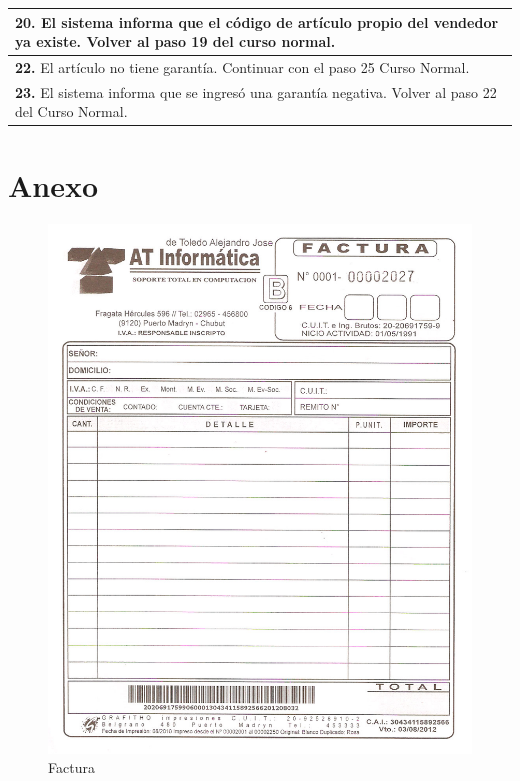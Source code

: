 \documentclass[12pt]{extarticle}
\begin{document}
\begin{spacing}{1.2}
\begin{longtable}{ |p{8cm}|p{8cm}| }
		\hline
		\multicolumn{2}{|p{16cm}|}{\textbf{20. }El sistema informa que el código de artículo propio del vendedor ya existe. Volver al paso 19 del curso normal.}\\
		\hline
		\multicolumn{2}{|p{16cm}|}{\textbf{22. }El artículo no tiene garantía. Continuar con el paso 25 Curso Normal.}\\
		\hline
		\multicolumn{2}{|p{16cm}|}{\textbf{23. }El sistema informa que se ingresó una garantía negativa. Volver al paso 22 del Curso Normal.}\\
		\hline
	\end{longtable}


























	\end{spacing}

	\pagebreak

	\section{Anexo}


	\begin{figure}[h]
	\includegraphics[scale=0.3]{images/atinformatica-facturaB.jpg}
	\caption{Factura}
	\end{figure}
\end{document}
